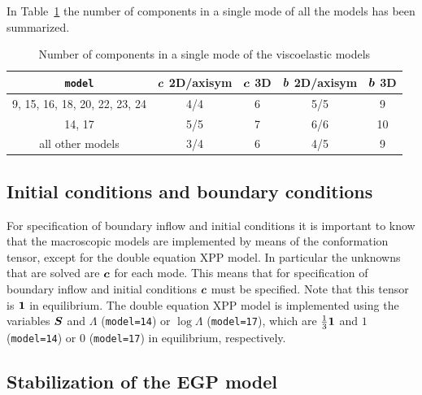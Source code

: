 In Table~\ref{tab:numcomp} the number of components in a single mode of all the models has been summarized.
\begin{table}[!hbtp]
\begin{center}
  \caption{Number of components in a single mode of the viscoelastic models}\label{tab:numcomp}\medskip
  \begin{tabular}{c|cccc}
    \texttt{model} & $\boldsymbol{c}$ 2D/axisym  & $\boldsymbol{c}$ 3D  & $\boldsymbol{b}$ 2D/axisym  & $\boldsymbol{b}$ 3D \\\hline
     9, 15, 16, 18, 20, 22, 23, 24 & 4/4 & 6 & 5/5 & 9 \\
     14, 17                & 5/5 & 7 & 6/6 & 10 \\
      all other models & 3/4 & 6 & 4/5 & 9
   \end{tabular}
\end{center}
\end{table}



\subsection{Initial conditions and boundary conditions}

For specification of boundary inflow and initial conditions it is
important to know that the macroscopic models are implemented by
means of the conformation tensor, except for the double equation XPP model.
In particular the unknowns that are
solved are $\boldsymbol{c}$ for each mode. This means that for
specification of boundary inflow and initial conditions $\boldsymbol{c}$
must be specified. Note that this tensor is $\boldsymbol{1}$ in equilibrium.
The double equation XPP model is implemented using the
variables $\boldsymbol{S}$ and $\Lambda$ (\texttt{model=14}) 
or $\log\Lambda$
(\texttt{model=17}), which
are $\frac13\boldsymbol{1}$ and $1$ (\texttt{model=14}) or $0$ (\texttt{model=17})
 in equilibrium, respectively.
 
\subsection{Stabilization of the EGP model}

